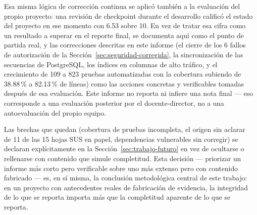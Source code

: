 Esa misma lógica de corrección continua se aplicó también a la evaluación del propio proyecto: una
revisión de checkpoint durante el desarrollo calificó el estado del proyecto en ese momento con 6.53
sobre 10. En vez de tratar esa cifra como un resultado a superar en el reporte final, se documenta aquí
como el punto de partida real, y las correcciones descritas en este informe (el cierre de los 6 fallos de
autorización de la Sección~\ref{sec:seguridad-corregida}, la sincronización de las secuencias de
PostgreSQL, los índices en columnas de alto tráfico, y el crecimiento de 109 a 823 pruebas automatizadas
con la cobertura subiendo de 38.88\,\% a 82.13\,\% de líneas) como las acciones concretas y verificables
tomadas después de esa evaluación. Este informe no reporta ni infiere una nota final --- eso corresponde
a una evaluación posterior por el docente-director, no a una autoevaluación del propio equipo.

Las brechas que quedan (cobertura de pruebas incompleta, el origen sin aclarar de 11 de las 15 hojas SUS
en papel, dependencias vulnerables sin corregir) se declaran explícitamente en la
Sección~\ref{sec:trabajo-futuro} en vez de ocultarse o rellenarse con contenido que simule completitud.
Esta decisión --- priorizar un informe más corto pero verificable sobre uno más extenso pero con
contenido fabricado --- es, en sí misma, la conclusión metodológica central de este trabajo: en un
proyecto con antecedentes reales de fabricación de evidencia, la integridad de lo que se reporta importa
más que la completitud aparente de lo que se reporta.
\newpage
